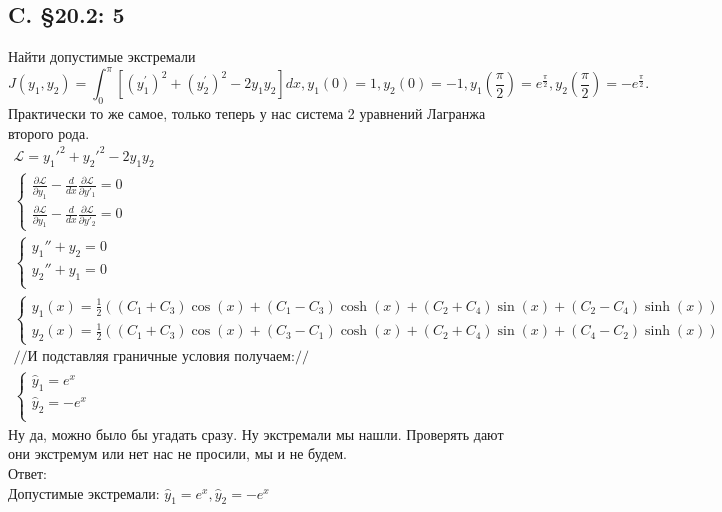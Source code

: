 \documentclass{article}
\newcommand{\Lagr}{\mathcal{L}}
\begin{document}
\subsection{C. \S20.2: 5}
Найти допустимые экстремали
\begin{equation}
J\left(y_{1}, y_{2}\right)=\int_{0}^{\pi}\left[\left(y_{1}^{\prime}\right)^{2}+\left(y_{2}^{\prime}\right)^{2}-2 y_{1} y_{2}\right] d x, y_{1}(0)=1, y_{2}(0)=-1, y_{1}\left(\frac{\pi}{2}\right)=e^{\frac{\pi}{2}}, y_{2}\left(\frac{\pi}{2}\right)=-e^{\frac{\pi}{2}} .
\end{equation}
Практически то же самое, только теперь у нас система 2 уравнений Лагранжа второго рода.
\begin{gather*}
    \Lagr = y_1'^2 + y_2'^2 -2 y_1 y_2\\
    \begin{cases}
         \frac{\partial \Lagr}{\partial y_1}  - \frac{d }{d x} \frac{\partial \Lagr}{\partial y'_1} = 0  \\
         \frac{\partial \Lagr}{\partial y_1}  - \frac{d }{d x} \frac{\partial \Lagr}{\partial y'_2} = 0  
    \end{cases}\\
    \begin{cases}
        y_1''+y_2=0\\
        y_2''+y_1=0\\
    \end{cases}\\
    \begin{cases}
        y_1(x) = \frac{1}{2} ((C_1+C_3) \cos (x)+(C_1-C_3) \cosh (x)+(C_2+C_4) \sin (x)+(C_2-C_4) \sinh (x))\\
        y_2(x) = \frac{1}{2} ((C_1+C_3) \cos (x)+(C_3-C_1) \cosh (x)+(C_2+C_4) \sin (x)+(C_4-C_2) \sinh (x))
    \end{cases}\\
    //\text{И подставляя граничные условия получаем:}//\\
    \begin{cases}
        \hat y_1=e^x\\
        \hat y_2 = - e^{x}\\
    \end{cases}
\end{gather*}
Ну да, можно было бы угадать сразу. Ну экстремали мы нашли. Проверять дают они экстремум или нет нас не просили, мы и не будем.\\
Ответ:\\
Допустимые экстремали: $\hat y_1=e^x, \hat y_2 = - e^{x}$
\end{document}
